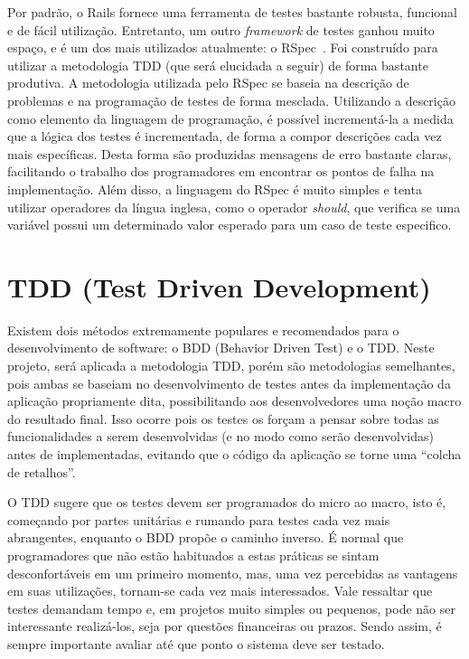 Por padrão, o Rails fornece uma ferramenta de testes bastante robusta, funcional e de fácil utilização. Entretanto, um outro \textit{framework} de testes ganhou muito espaço, e é um dos mais utilizados atualmente: o RSpec~\cite{rspec}. Foi construído para utilizar a metodologia TDD (que será elucidada a seguir) de forma bastante produtiva. A metodologia utilizada pelo RSpec se baseia na descrição de problemas e na programação de testes de forma mesclada. Utilizando a descrição como elemento da linguagem de programação, é possível incrementá-la a medida que a lógica dos testes é incrementada, de forma a compor descrições cada vez mais específicas. Desta forma são produzidas mensagens de erro bastante claras, facilitando o trabalho dos programadores em encontrar os pontos de falha na implementação. Além disso, a linguagem do RSpec é muito simples e tenta utilizar operadores da língua inglesa, como o operador \textit{should}, que verifica se uma variável possui um determinado valor esperado para um caso de teste especifico.~\cite{practicaloo}

\section{TDD (Test Driven Development)}

Existem dois métodos extremamente populares e recomendados para o desenvolvimento de software: o BDD (Behavior Driven Test)
e o TDD. Neste projeto, será aplicada a metodologia TDD, porém são metodologias semelhantes, pois ambas se baseiam no desenvolvimento de testes antes da implementação da aplicação propriamente dita, possibilitando aos desenvolvedores uma noção macro do resultado final. Isso ocorre pois os testes os forçam a pensar sobre todas as funcionalidades a serem desenvolvidas (e no modo como serão desenvolvidas) antes de implementadas, evitando que o código da aplicação se torne uma ``colcha de retalhos''.

O TDD sugere que os testes devem ser programados do micro ao macro, isto é, começando por partes unitárias e rumando para testes cada vez mais abrangentes, enquanto o BDD propõe o caminho inverso. É normal que programadores que não estão habituados a estas práticas se sintam desconfortáveis em um primeiro momento, mas, uma vez percebidas as vantagens em suas utilizações, tornam-se cada vez mais interessados. Vale ressaltar que testes demandam tempo e, em projetos muito simples ou pequenos, pode não ser interessante realizá-los, seja por questões financeiras ou prazos. Sendo assim, é sempre importante avaliar até que ponto o sistema deve ser testado.

